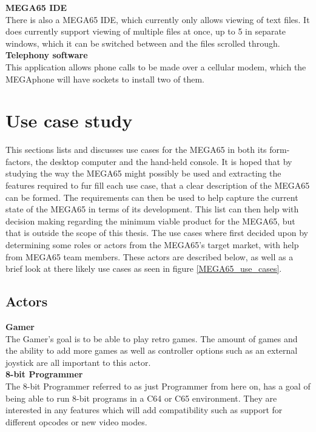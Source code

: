 \textbf{MEGA65 IDE}\\
There is also a MEGA65 IDE, which currently only allows viewing of text files. It does currently support viewing of multiple files at once, up to 5 in separate windows, which it can be switched between and the files scrolled through.\\

\textbf{Telephony software}\\
This application allows phone calls to be made over a cellular modem, which the MEGAphone will have sockets to install two of them. \\


\section{Use case study}
This sections lists and discusses use cases for the MEGA65 in both its form-factors, the desktop computer and the hand-held console. It is hoped that by studying the way the MEGA65 might possibly be used and extracting the features required to fur fill each use case, that a clear description of the MEGA65 can be formed. The requirements can then be used to help capture the current state of the MEGA65 in terms of its development. This list can then help with decision making regarding the minimum viable product for the MEGA65, but that is outside the scope of this thesis. The use cases where first decided upon by determining some roles or actors from the MEGA65's target market, with help from MEGA65 team members. These actors are described below, as well as a brief look at there likely use cases as seen in figure \ref{MEGA65_use_cases}.

\subsection{Actors}
\textbf{Gamer}\\
The Gamer's goal is to be able to play retro games. The amount of games and the ability to add more games as well as controller options such as an external joystick are all important to this actor.\\

\textbf{8-bit Programmer}\\
The 8-bit Programmer referred to as just Programmer from here on, has a goal of being able to run 8-bit programs in a C64 or C65 environment. They are interested in any features which will add compatibility such as support for different opcodes or new video modes. \\

